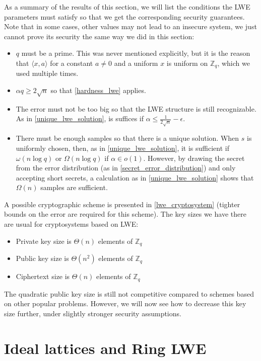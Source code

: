 \documentclass{report}
\newcommand{\Z}{\mathbb{Z}}
\begin{document}
As a summary of the results of this section, we will list the conditions the LWE parameters must satisfy so that we get the corresponding security guarantees. Note that in some cases, other values may not lead to an insecure system, we just cannot prove its security the same way we did in this section:
\begin{itemize}
\item $q$ must be a prime. This was never mentioned explicitly, but it is the reason that $\langle x, a \rangle$ for a constant $a \neq 0$ and a uniform $x$ is uniform on $\Z_q$, which we used multiple times.
\item $\alpha q \geq 2\sqrt{n}$ so that \ref{hardness_lwe} applies.
\item The error must not be too big so that the LWE structure is still recognizable. As in \ref{unique_lwe_solution}, is suffices if $\alpha \leq \frac 1 {2\sqrt{n}} - \epsilon$.
\item There must be enough samples so that there is a unique solution. When $s$ is uniformly chosen, then, as in \ref{unique_lwe_solution}, it is sufficient if $\omega(n\log q)$ or $\Omega(n\log q)$ if $\alpha \in o(1)$. However, by drawing the secret from the error distribution (as in \ref{secret_error_distribution}) and only accepting short secrets, a calculation as in \ref{unique_lwe_solution} shows that $\Omega(n)$ samples are sufficient.
\end{itemize}
A possible cryptographic scheme is presented in \ref{lwe_cryptosystem} (tighter bounds on the error are required for this scheme). The key sizes we have there are usual for cryptosystems based on LWE:
\begin{itemize}
\item Private key size is $\Theta(n)$ elements of $\Z_q$
\item Public key size is $\Theta(n^2)$ elements of $\Z_q$
\item Ciphertext size is $\Theta(n)$ elements of $\Z_q$
\end{itemize}
The quadratic public key size is still not competitive compared to schemes based on other popular problems. However, we will now see how to decrease this key size further, under slightly stronger security assumptions.


\chapter{Ideal lattices and Ring LWE}
\end{document}
